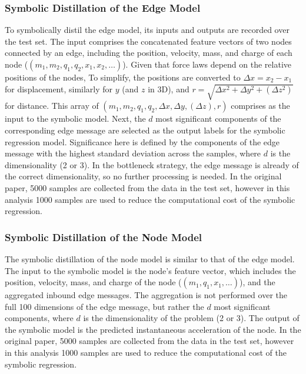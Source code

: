 \documentclass[11pt]{article}
\begin{document}
\subsubsection{Symbolic Distillation of the Edge Model}
To symbolically distil the edge model, its inputs and outputs are recorded over the test set. The input comprises the concatenated feature vectors of two nodes connected by an edge, including the position, velocity, mass, and charge of each node ($(m_1, m_2, q_1, q_2, x_1, x_2, \ldots)$). Given that force laws depend on the relative positions of the nodes, To simplify, the positions are converted to $\Delta x = x_2 - x_1$ for displacement, similarly for $y$ (and $z$ in 3D), and $r = \sqrt{\Delta x^2 + \Delta y^2 + (\Delta z^2)}$ for distance. This array of $(m_1, m_2, q_1, q_2, \Delta x, \Delta y, (\Delta z), r)$ comprises as the input to the symbolic model. Next, the $d$ most significant components of the corresponding edge message are selected as the output labels for the symbolic regression model. Significance here is defined by the components of the edge message with the highest standard deviation across the samples, where $d$ is the dimensionality (2 or 3). In the bottleneck strategy, the edge message is already of the correct dimensionality, so no further processing is needed. In the original paper, 5000 samples are collected from the data in the test set, however in this analysis 1000 samples are used to reduce the computational cost of the symbolic regression.

\subsubsection{Symbolic Distillation of the Node Model}
The symbolic distillation of the node model is similar to that of the edge model. The input to the symbolic model is the node's feature vector, which includes the position, velocity, mass, and charge of the node ($(m_1, q_1, x_1, \ldots)$), and the aggregated inbound edge messages. The aggregation is not performed over the full 100 dimensions of the edge message, but rather the $d$ most significant components, where $d$ is the dimensionality of the problem (2 or 3). The output of the symbolic model is the predicted instantaneous acceleration of the node. In the original paper, 5000 samples are collected from the data in the test set, however in this analysis 1000 samples are used to reduce the computational cost of the symbolic regression.
\end{document}
